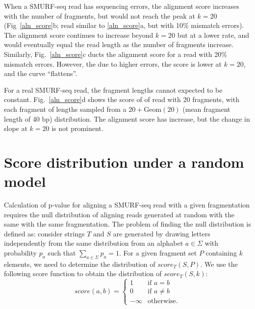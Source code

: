 When a SMURF-seq read has sequencing errors, the alignment score
increases with the number of fragments, but would not reach the peak at
$k=20$ (Fig~\ref{aln_score}b; read similar to \ref{aln_score}a, but with
10\% mismatch errors). The alignment score continues to increase beyond
$k=20$ but at a lower rate, and would eventually equal the read length
as the number of fragments increase. Similarly, Fig.~\ref{aln_score}c
ducts the alignment score for a read with 20\% mismatch errors. However,
the due to higher errors, the score is lower at $k=20$, and the curve
``flattens''.

For a real SMURF-seq read, the fragment lengths cannot expected to be
constant. Fig.~\ref{aln_score}d shows the score of of read with 20
fragments, with each fragment of lengths sampled from a $20 +
\text{Geom}(20)$ (mean fragment length of 40 bp) distribution. The
alignment score has increase, but the change in slope at $k=20$ is not
prominent.

\section{Score distribution under a random model}
Calculation of p-value for aligning a SMURF-seq read with a given
fragmentation requires the null distribution of aligning reads
generated at random with the same with the same fragmentation. The
problem of finding the null distribution is defined as:
consider strings $T$ and $S$ are generated by drawing letters independently
from the same distribution from an alphabet $a \in \Sigma$ with
probability $p_a$ such that $\sum_{a \in \Sigma} p_a = 1$.  For a given
fragment set $P$ containing $k$ elements, we need to determine the
distribution of $score_T(S, P)$.
We use the following score function to obtain the distribution of
$score_T(S,k)$:
\begin{equation*}
\label{exact_score}
score(a,b)=\begin{cases} 1 & \text{if } a = b \\
            0 & \text{if } a\neq b \\
            -\infty & \text{otherwise.}
\end{cases}
\end{equation*}

